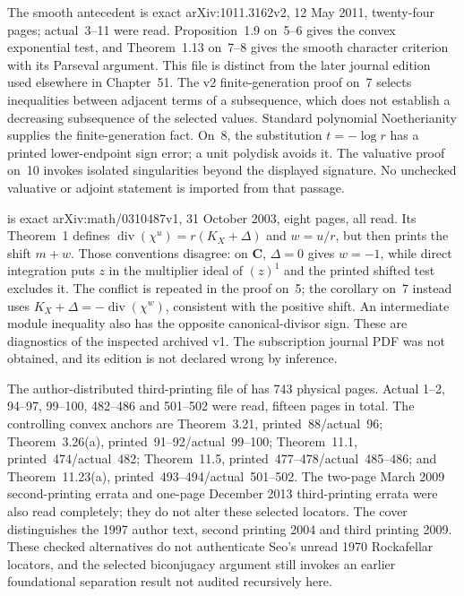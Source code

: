 The smooth antecedent \cite{Guenancia11ToricArchivedV2} is exact
arXiv:1011.3162v2, 12 May 2011, twenty-four pages; actual~3--11
were read. Proposition~1.9 on~5--6 gives the convex exponential
test, and Theorem~1.13 on~7--8 gives the smooth character criterion
with its Parseval argument. This file is distinct from the later
\cite{Guenancia12} journal edition used elsewhere in Chapter~51.
The v2 finite-generation proof on~7 selects inequalities between
adjacent terms of a subsequence, which does not establish a decreasing
subsequence of the selected values. Standard polynomial Noetherianity
supplies the finite-generation fact. On~8, the substitution
$t=-\log r$ has a printed lower-endpoint sign error; a unit
polydisk avoids it. The valuative proof on~10 invokes isolated
singularities beyond the displayed signature. No unchecked valuative
or adjoint statement is imported from that passage.

\cite{Blickle03ToricArchivedV1} is exact arXiv:math/0310487v1,
31 October 2003, eight pages, all read. Its Theorem~1 defines
$\operatorname{div}(\chi^u)=r(K_X+\Delta)$ and $w=u/r$, but
then prints the shift $m+w$. Those conventions disagree: on
$\mathbf C$, $\Delta=0$ gives $w=-1$, while direct integration
puts $z$ in the multiplier ideal of $(z)^1$ and the printed shifted
test excludes it. The conflict is repeated in the proof on~5;
the corollary on~7 instead uses
$K_X+\Delta=-\operatorname{div}(\chi^w)$, consistent with the
positive shift. An intermediate module inequality also has the
opposite canonical-divisor sign. These are diagnostics of the
inspected archived v1. The subscription journal PDF was not obtained,
and its edition is not declared wrong by inference.

The author-distributed third-printing file of
\cite{RockafellarWets09Author} has 743 physical pages. Actual
1--2, 94--97, 99--100, 482--486 and 501--502 were read,
fifteen pages in total. The controlling convex anchors are
Theorem~3.21, printed~88/actual~96; Theorem~3.26(a),
printed~91--92/actual~99--100; Theorem~11.1,
printed~474/actual~482; Theorem~11.5,
printed~477--478/actual~485--486; and Theorem~11.23(a),
printed~493--494/actual~501--502. The two-page March 2009
second-printing errata and one-page December 2013 third-printing
errata were also read completely; they do not alter these selected
locators. The cover distinguishes the 1997 author text, second
printing 2004 and third printing 2009. These checked alternatives
do not authenticate Seo's unread 1970 Rockafellar locators, and
the selected biconjugacy argument still invokes an earlier foundational
separation result not audited recursively here.

